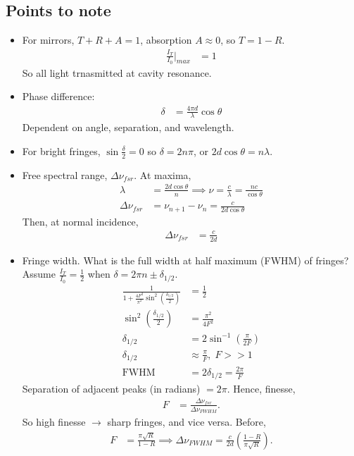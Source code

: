\documentclass[a4paper, 11pt, normalem]{report}
\begin{document}
\subsection{Points to note}
\begin{itemize}
    \item For mirrors, $T+R+A = 1$, absorption $A\approx0$, so $T=1-R$.
        \begin{align}
            \frac{I_T}{I_0}\bigg|_{max} &= 1
        \end{align}
        So all light trnasmitted at cavity resonance.
    \item Phase difference:
        \begin{align}
            \delta &= \frac{4\pi d}{\lambda}\cos\theta
        \end{align}
        Dependent on angle, separation, and wavelength. 
    \item For bright fringes, $\sin\frac{\delta}{2}=0$ so $\delta=2n\pi$, or $2d\cos\theta = n\lambda$.
    \item Free spectral range, $\Delta\nu_{fsr}$. At maxima, 
        \begin{align}
            \lambda &= \frac{2d\cos\theta}{n} \implies \nu = \frac{c}{\lambda} = \frac{nc}{\cos\theta} \\
            \Delta\nu_{fsr} &= \nu_{n+1}-\nu_n = \frac{c}{2d\cos\theta}
        \end{align}
        Then, at normal incidence, 
        \begin{align}
            \Delta\nu_{fsr} &= \frac{c}{2d}
        \end{align}
    \item Fringe width. What is the full width at half maximum (FWHM) of fringes? Assume $\frac{I_T}{I_0}=\frac12$ when $\delta=2\pi n\pm\delta_{1/2}$.
        \begin{align}
            \frac{1}{1+\frac{4F^2}{\pi^2}\sin^2(\frac{\delta_{1/2}}{2})} &= \frac12\\
            \sin^2\left(\frac{\delta_{1/2}}{2}\right) &= \frac{\pi^2}{4F^2} \\
            \delta_{1/2} &= 2\sin^{-1}\left(\frac{\pi}{2F}\right) \\
            \delta_{1/2} &\approx \frac{\pi}{F},\; F >> 1 \\
            \text{FWHM} &= 2\delta_{1/2} = \frac{2\pi}{F}
        \end{align}
        Separation of adjacent peaks (in radians) $=2\pi$.
        Hence, finesse, 
        \begin{align}
            F &= \frac{\Delta\nu_{fsr}}{\Delta\nu_{FWHM}}.
        \end{align}
        So high finesse $\to$ sharp fringes, and vice versa.
        Before, 
        \begin{align}
            F &= \frac{\pi\sqrt{R}}{1-R} \implies \Delta\nu_{FWHM} = \frac{c}{2d}\left(\frac{1-R}{\pi\sqrt{R}}\right).
        \end{align}
\end{itemize}
\end{document}

